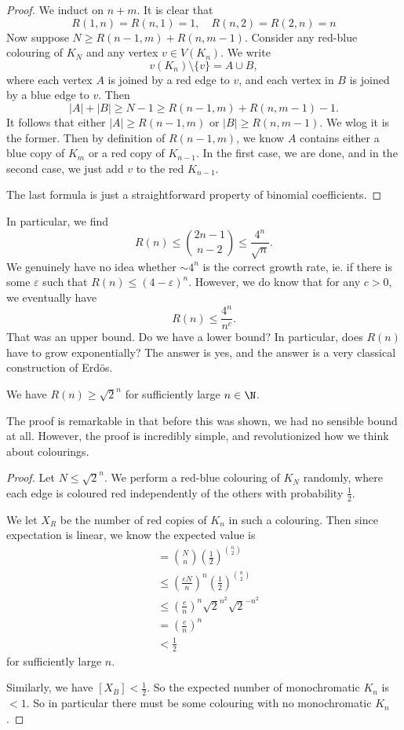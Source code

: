 \documentclass[a4paper]{article}
\begin{document}
\begin{proof}
  We induct on $n + m$. It is clear that
  \[
    R(1, n) = R(n, 1) = 1,\quad R(n, 2) = R(2, n) = n
  \]
  Now suppose $N \geq R(n - 1, m) + R(n, m - 1)$. Consider any red-blue colouring of $K_N$ and any vertex $v \in V(K_n)$. We write
  \[
    v(K_n) \setminus \{v\} = A \cup B,
  \]
  where each vertex $A$ is joined by a red edge to $v$, and each vertex in $B$ is joined by a blue edge to $v$. Then
  \[
    |A| + |B| \geq N - 1 \geq R(n - 1, m) + R(n, m - 1) - 1.
  \]
  It follows that either $|A| \geq R(n - 1, m)$ or $|B| \geq R(n, m - 1)$. We wlog it is the former. Then by definition of $R(n - 1, m)$, we know $A$ contains either a blue copy of $K_m$ or a red copy of $K_{n - 1}$. In the first case, we are done, and in the second case, we just add $v$ to the red $K_{n - 1}$.

  The last formula is just a straightforward property of binomial coefficients.
\end{proof}

In particular, we find
\[
  R(n) \leq \binom{2n - 1}{n - 2} \leq \frac{4^n}{\sqrt{n}}.
\]
We genuinely have no idea whether $\sim 4^n$ is the correct growth rate, ie. if there is some $\varepsilon$ such that $R(n) \leq (4 - \varepsilon)^n$. However, we do know that for any $c > 0$, we eventually have
\[
  R(n) \leq \frac{4^n}{n^c}.
\]
That was an upper bound. Do we have a lower bound? In particular, does $R(n)$ have to grow exponentially? The answer is yes, and the answer is a very classical construction of Erd\"os.

\begin{thm}
  We have $R(n) \geq \sqrt{2}^n$ for sufficiently large $n \in \N$.
\end{thm}
The proof is remarkable in that before this was shown, we had no sensible bound at all. However, the proof is incredibly simple, and revolutionized how we think about colourings.

\begin{proof}
  Let $N \leq \sqrt{2}^n$. We perform a red-blue colouring of $K_N$ randomly, where each edge is coloured red independently of the others with probability $\frac{1}{2}$.

  We let $X_R$ be the number of red copies of $K_n$ in such a colouring. Then since expectation is linear, we know the expected value is
  \begin{align*}
    [X_R] &= \binom{N}{n} \left(\frac{1}{2}\right)^{\binom{n}{2}}\\
    &\leq \left(\frac{eN}{n}\right)^n \left(\frac{1}{2}\right)^{\binom{n}{2}}\\
    &\leq \left(\frac{e}{n}\right)^n \sqrt{2}^{n^2} \sqrt{2}^{-n^2}\\
    &= \left(\frac{e}{n}\right)^{n}\\
    &< \frac{1}{2}
  \end{align*}
  for sufficiently large $n$.

  Similarly, we have $[X_B] < \frac{1}{2}$. So the expected number of monochromatic $K_n$ is $< 1$. So in particular there must be some colouring with no monochromatic $K_n$.
\end{proof}
\end{document}
